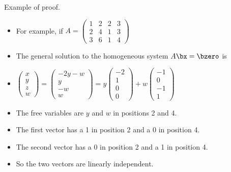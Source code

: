 \documentclass{beamer}
\begin{document}
\begin{frame}{Example of proof.}
\begin{itemize}
\item For example, if
$A=
\begin{pmatrix}
1 & 2 & 2 & 3 \\
2 & 4 & 1 & 3 \\
3 & 6 & 1 & 4
\end{pmatrix}
$
\item The general solution to the homogeneous system $A\bx=\bzero$ is
\item
$
\begin{pmatrix}
x \\ y \\ z \\ w
\end{pmatrix}
=
\begin{pmatrix}
-2y - w \\
y \\
-w \\
w
\end{pmatrix}
=
y
\begin{pmatrix}
-2 \\
1 \\
0 \\
0
\end{pmatrix}
+
w
\begin{pmatrix}
-1 \\
0 \\
-1 \\
1
\end{pmatrix}
$
\item The free variables are $y$ and $w$ in positions 2 and 4.
\item The first vector has a 1 in position 2 and a 0 in position 4.
\item The second vector has a 0 in position 2 and a 1 in position 4.
\item So the two vectors are linearly independent.
\end{itemize}
\end{frame}
\end{document}
